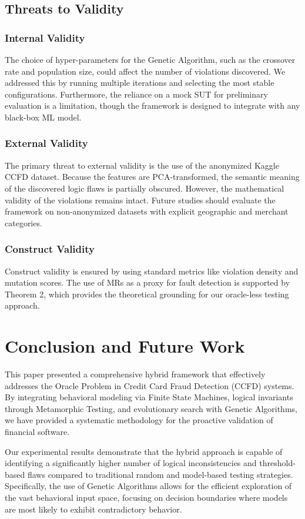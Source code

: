 \documentclass[review]{elsarticle}
\begin{document}
\subsection{Threats to Validity}
\subsubsection{Internal Validity}
The choice of hyper-parameters for the Genetic Algorithm, such as the crossover rate and population size, could affect the number of violations discovered. We addressed this by running multiple iterations and selecting the most stable configurations. Furthermore, the reliance on a mock SUT for preliminary evaluation is a limitation, though the framework is designed to integrate with any black-box ML model.

\subsubsection{External Validity}
The primary threat to external validity is the use of the anonymized Kaggle CCFD dataset. Because the features are PCA-transformed, the semantic meaning of the discovered logic flaws is partially obscured. However, the mathematical validity of the violations remains intact. Future studies should evaluate the framework on non-anonymized datasets with explicit geographic and merchant categories.

\subsubsection{Construct Validity}
Construct validity is ensured by using standard metrics like violation density and mutation scores. The use of MRs as a proxy for fault detection is supported by Theorem 2, which provides the theoretical grounding for our oracle-less testing approach.

\section{Conclusion and Future Work}
This paper presented a comprehensive hybrid framework that effectively addresses the Oracle Problem in Credit Card Fraud Detection (CCFD) systems. By integrating behavioral modeling via Finite State Machines, logical invariants through Metamorphic Testing, and evolutionary search with Genetic Algorithms, we have provided a systematic methodology for the proactive validation of financial software.

Our experimental results demonstrate that the hybrid approach is capable of identifying a significantly higher number of logical inconsistencies and threshold-based flaws compared to traditional random and model-based testing strategies. Specifically, the use of Genetic Algorithms allows for the efficient exploration of the vast behavioral input space, focusing on decision boundaries where models are most likely to exhibit contradictory behavior.
\end{document}
